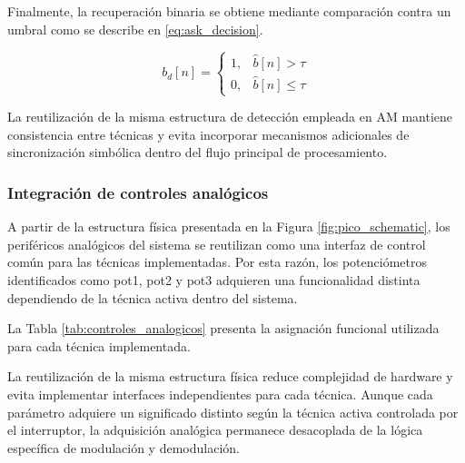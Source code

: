 Finalmente, la recuperación binaria se obtiene mediante comparación contra un umbral como se describe en \eqref{eq:ask_decision}.

\begin{equation}
b_d[n] =
\begin{cases}
1, & \hat{b}[n] > \tau \\
0, & \hat{b}[n] \leq \tau
\end{cases}
\label{eq:ask_decision}
\end{equation}

La reutilización de la misma estructura de detección empleada en AM mantiene consistencia entre técnicas y evita incorporar mecanismos adicionales de sincronización simbólica dentro del flujo principal de procesamiento.

\subsubsection{Integración de controles analógicos}

A partir de la estructura física presentada en la Figura \ref{fig:pico_schematic}, los periféricos analógicos del sistema se reutilizan como una interfaz de control común para las técnicas implementadas. Por esta razón, los potenciómetros identificados como pot1, pot2 y pot3 adquieren una funcionalidad distinta dependiendo de la técnica activa dentro del sistema.

La Tabla \ref{tab:controles_analogicos} presenta la asignación funcional utilizada para cada técnica implementada.

\begin{table}[H]
\centering
\caption{Asignación de controles analógicos por técnica implementada.}
\label{tab:controles_analogicos}
\end{table}

La reutilización de la misma estructura física reduce complejidad de hardware y evita implementar interfaces independientes para cada técnica. Aunque cada parámetro adquiere un significado distinto según la técnica activa controlada por el interruptor, la adquisición analógica permanece desacoplada de la lógica específica de modulación y demodulación.

